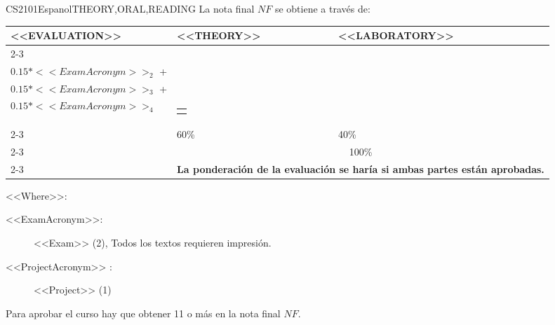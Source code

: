   \begin{evaluation}{CS2101}{Espanol}{THEORY,ORAL,READING}
  La nota final $NF$ se obtiene a través de:
 
  \begin{tabularx}{0.9\textwidth}{|X|p{}|p{}|} \hline
  \multirow{4}{*}{\uppercase{<<Evaluation>>}} & \uppercase{<<Theory>>} & \uppercase{<<Laboratory>>} \\ \cline{2-3}
  & %
      \begin{minipage}{0.95\textwidth}
      \begin{tabular}{l}
          $0.15* <<ExamAcronym>>_{1}$ + \\  
          $0.15* <<ExamAcronym>>_{2}$ + \\ 
          $0.15* <<ExamAcronym>>_{3}$ + \\  
          $0.15* <<ExamAcronym>>_{4}$
      \end{tabular} 
      \end{minipage} 
  & %
      \begin{minipage}{0.95\textwidth}
      \begin{tabular}{l}
          $0.40*<<ProjectAcronym>>_{1}$
          \end{tabular} 
      \end{minipage}                 \\ \cline{2-3}
  
  & %
  60\% 
  & %
  40\% \\ \cline{2-3}
  & \multicolumn{2}{c|}{100\%}  \\ \cline{2-3}
  & \multicolumn{2}{c|}{\textbf{La ponderación de la evaluación se haría si ambas partes están aprobadas.}}  \\ \hline
  \end{tabularx}
  
  \vspace{2mm}
  \noindent <<Where>>:
  \begin{description}
      \item[<<ExamAcronym>>:] <<Exam>> (2), Todos los textos requieren impresión.
      \item[<<ProjectAcronym>> :] <<Project>> (1)
  \end{description}
      
  \noindent Para aprobar el curso hay que obtener 11 o más en la nota final $NF$.
  \end{evaluation}
 
